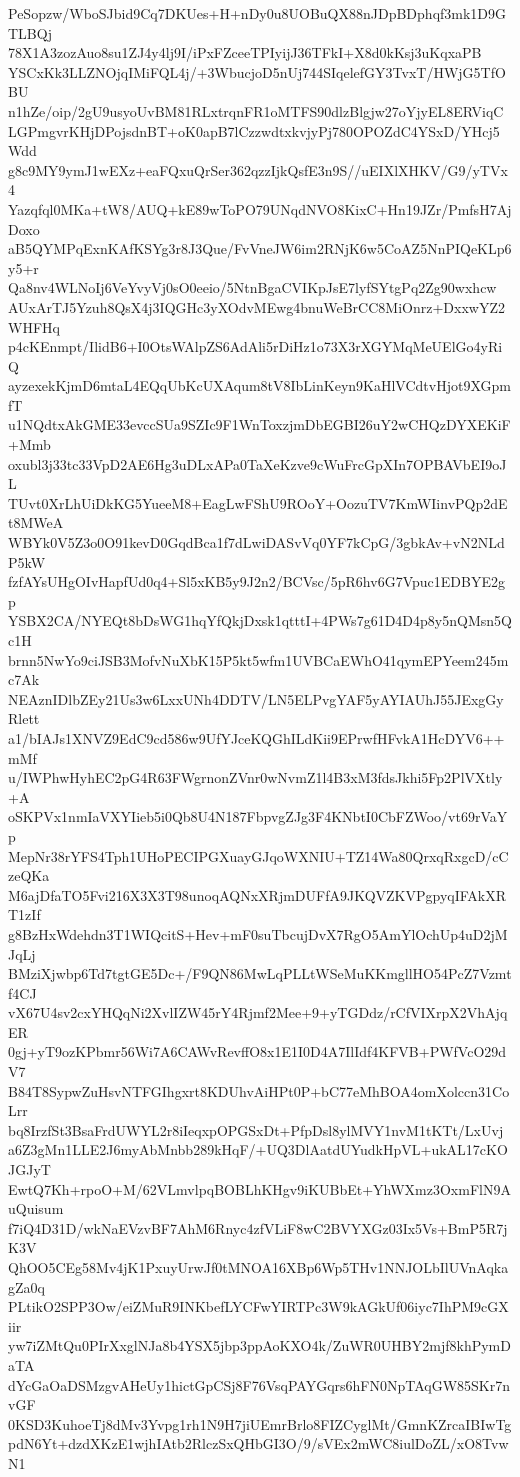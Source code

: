 PeSopzw/WboSJbid9Cq7DKUes+H+nDy0u8UOBuQX88nJDpBDphqf3mk1D9GTLBQj
78X1A3zozAuo8su1ZJ4y4lj9I/iPxFZceeTPIyijJ36TFkI+X8d0kKsj3uKqxaPB
YSCxKk3LLZNOjqIMiFQL4j/+3WbucjoD5nUj744SIqelefGY3TvxT/HWjG5TfOBU
n1hZe/oip/2gU9usyoUvBM81RLxtrqnFR1oMTFS90dlzBlgjw27oYjyEL8ERViqC
LGPmgvrKHjDPojsdnBT+oK0apB7lCzzwdtxkvjyPj780OPOZdC4YSxD/YHcj5Wdd
g8c9MY9ymJ1wEXz+eaFQxuQrSer362qzzIjkQsfE3n9S//uEIXlXHKV/G9/yTVx4
Yazqfql0MKa+tW8/AUQ+kE89wToPO79UNqdNVO8KixC+Hn19JZr/PmfsH7AjDoxo
aB5QYMPqExnKAfKSYg3r8J3Que/FvVneJW6im2RNjK6w5CoAZ5NnPIQeKLp6y5+r
Qa8nv4WLNoIj6VeYvyVj0sO0eeio/5NtnBgaCVIKpJsE7lyfSYtgPq2Zg90wxhcw
AUxArTJ5Yzuh8QsX4j3IQGHc3yXOdvMEwg4bnuWeBrCC8MiOnrz+DxxwYZ2WHFHq
p4cKEnmpt/IlidB6+I0OtsWAlpZS6AdAli5rDiHz1o73X3rXGYMqMeUElGo4yRiQ
ayzexekKjmD6mtaL4EQqUbKcUXAqum8tV8IbLinKeyn9KaHlVCdtvHjot9XGpmfT
u1NQdtxAkGME33evccSUa9SZIc9F1WnToxzjmDbEGBI26uY2wCHQzDYXEKiF+Mmb
oxubl3j33tc33VpD2AE6Hg3uDLxAPa0TaXeKzve9cWuFrcGpXIn7OPBAVbEI9oJL
TUvt0XrLhUiDkKG5YueeM8+EagLwFShU9ROoY+OozuTV7KmWIinvPQp2dEt8MWeA
WBYk0V5Z3o0O91kevD0GqdBca1f7dLwiDASvVq0YF7kCpG/3gbkAv+vN2NLdP5kW
fzfAYsUHgOIvHapfUd0q4+Sl5xKB5y9J2n2/BCVsc/5pR6hv6G7Vpuc1EDBYE2gp
YSBX2CA/NYEQt8bDsWG1hqYfQkjDxsk1qtttI+4PWs7g61D4D4p8y5nQMsn5Qc1H
brnn5NwYo9ciJSB3MofvNuXbK15P5kt5wfm1UVBCaEWhO41qymEPYeem245mc7Ak
NEAznIDlbZEy21Us3w6LxxUNh4DDTV/LN5ELPvgYAF5yAYIAUhJ55JExgGyRlett
a1/bIAJs1XNVZ9EdC9cd586w9UfYJceKQGhILdKii9EPrwfHFvkA1HcDYV6++mMf
u/IWPhwHyhEC2pG4R63FWgrnonZVnr0wNvmZ1l4B3xM3fdsJkhi5Fp2PlVXtly+A
oSKPVx1nmIaVXYIieb5i0Qb8U4N187FbpvgZJg3F4KNbtI0CbFZWoo/vt69rVaYp
MepNr38rYFS4Tph1UHoPECIPGXuayGJqoWXNIU+TZ14Wa80QrxqRxgcD/cCzeQKa
M6ajDfaTO5Fvi216X3X3T98unoqAQNxXRjmDUFfA9JKQVZKVPgpyqIFAkXRT1zIf
g8BzHxWdehdn3T1WIQcitS+Hev+mF0suTbcujDvX7RgO5AmYlOchUp4uD2jMJqLj
BMziXjwbp6Td7tgtGE5Dc+/F9QN86MwLqPLLtWSeMuKKmgllHO54PcZ7Vzmtf4CJ
vX67U4sv2cxYHQqNi2XvlIZW45rY4Rjmf2Mee+9+yTGDdz/rCfVIXrpX2VhAjqER
0gj+yT9ozKPbmr56Wi7A6CAWvRevffO8x1E1I0D4A7IlIdf4KFVB+PWfVcO29dV7
B84T8SypwZuHsvNTFGIhgxrt8KDUhvAiHPt0P+bC77eMhBOA4omXolccn31CoLrr
bq8IrzfSt3BsaFrdUWYL2r8iIeqxpOPGSxDt+PfpDsl8ylMVY1nvM1tKTt/LxUvj
a6Z3gMn1LLE2J6myAbMnbb289kHqF/+UQ3DlAatdUYudkHpVL+ukAL17cKOJGJyT
EwtQ7Kh+rpoO+M/62VLmvlpqBOBLhKHgv9iKUBbEt+YhWXmz3OxmFlN9AuQuisum
f7iQ4D31D/wkNaEVzvBF7AhM6Rnyc4zfVLiF8wC2BVYXGz03Ix5Vs+BmP5R7jK3V
QhOO5CEg58Mv4jK1PxuyUrwJf0tMNOA16XBp6Wp5THv1NNJOLbIlUVnAqkagZa0q
PLtikO2SPP3Ow/eiZMuR9INKbefLYCFwYIRTPc3W9kAGkUf06iyc7IhPM9cGXiir
yw7iZMtQu0PIrXxglNJa8b4YSX5jbp3ppAoKXO4k/ZuWR0UHBY2mjf8khPymDaTA
dYcGaOaDSMzgvAHeUy1hictGpCSj8F76VsqPAYGqrs6hFN0NpTAqGW85SKr7nvGF
0KSD3KuhoeTj8dMv3Yvpg1rh1N9H7jiUEmrBrlo8FIZCyglMt/GmnKZrcaIBIwTg
pdN6Yt+dzdXKzE1wjhIAtb2RlczSxQHbGI3O/9/sVEx2mWC8iulDoZL/xO8TvwN1
